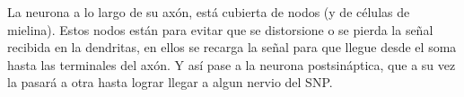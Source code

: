 La neurona a lo largo de su axón, está cubierta de nodos (y de células de mielina). Estos nodos están para evitar que se distorsione o se pierda la señal recibida en la dendritas, en ellos se recarga la señal para que llegue desde el soma hasta las terminales del axón. Y así pase a la neurona postsináptica, que a su vez la pasará a otra hasta lograr llegar a algun nervio del SNP. 






 
 


